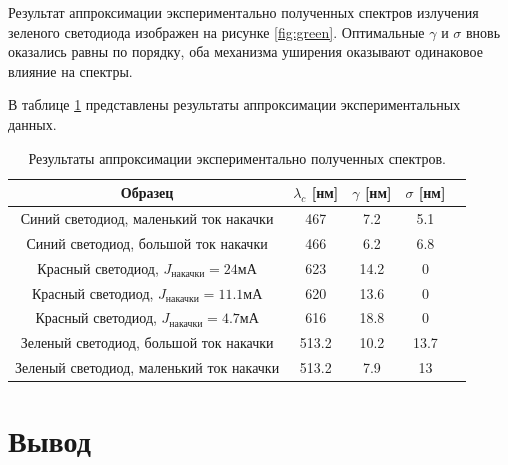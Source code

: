 \documentclass[a4paper, 12pt]{extarticle}
\begin{document}
Результат аппроксимации экспериментально полученных спектров излучения зеленого светодиода изображен на рисунке \ref{fig:green}. Оптимальные $\gamma$ и $\sigma$ вновь оказались равны по порядку, оба механизма уширения оказывают одинаковое влияние на спектры.


В таблице \ref{tab:sample} представлены результаты аппроксимации экспериментальных данных. 
\begin{table}[h!]
    \centering
    \begin{tabular}{|c|c|c|c|c|}
    \hline
    \textbf{Образец} & \textbf{$\lambda_c$} [нм] & \textbf{$\gamma$} [нм] & \textbf{$\sigma$} [нм] \\ \hline
    
    Синий светодиод, маленький ток накачки & 467  & 7.2 & 5.1 \\ \hline
    Синий светодиод, большой ток накачки &  466 & 6.2 & 6.8 \\ \hline
    Красный светодиод, $J_{\text{накачки}} = 24$мА & 623 & 14.2 & 0\\ \hline
    Красный светодиод, $J_{\text{накачки}} = 11.1$мА & 620 & 13.6 & 0 \\ \hline
    Красный светодиод, $J_{\text{накачки}} = 4.7$мА & 616 & 18.8 & 0 \\ \hline
    Зеленый светодиод, большой ток накачки & 513.2 & 10.2 & 13.7 \\ \hline
    Зеленый светодиод, маленький ток накачки & 513.2 & 7.9 & 13 \\ \hline

    \end{tabular}
    \caption{Результаты аппроксимации экспериментально полученных спектров.}
    \label{tab:sample}
\end{table}
    



\section*{\textcolor{header}{Вывод}}
\end{document}
